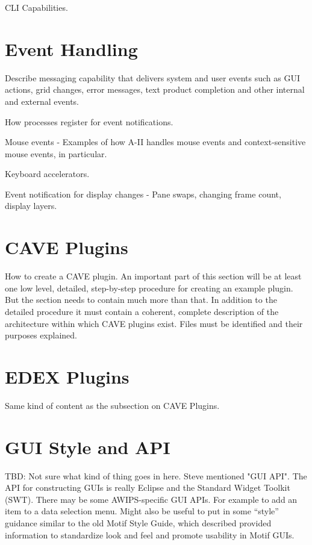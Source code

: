 CLI Capabilities.  

\section{Event Handling}

Describe messaging capability that delivers system and user 
events such as GUI actions, grid changes, error messages, 
text product completion and other internal and external events.

How processes register for event notifications.

Mouse events - Examples of how A-II handles mouse events and 
context-sensitive mouse events, in particular.

Keyboard accelerators.

Event notification for display changes - Pane swaps, changing frame 
count, display layers.


\section{CAVE Plugins}

How to create a CAVE plugin.  An important part of this section 
will be at least one low level, detailed, step-by-step procedure for 
creating an example plugin.  But the section needs to contain much more 
than that.  In addition to the detailed procedure it must contain a 
coherent, complete description of the architecture within which CAVE 
plugins exist.  Files must be identified and their purposes explained.


\section{EDEX Plugins}

Same kind of content as the subsection on CAVE Plugins.


\section{GUI Style and API}

TBD:  Not sure what kind of thing goes in here.  Steve mentioned 
"GUI API".  The API for constructing GUIs is really Eclipse
and the Standard Widget Toolkit (SWT).  There may be some
AWIPS-specific GUI APIs.  For example to add an item to a
data selection menu.  Might also be useful to put in some
``style'' guidance similar to the old Motif Style Guide,
which described provided information to standardize look and
feel and promote usability in Motif GUIs.

